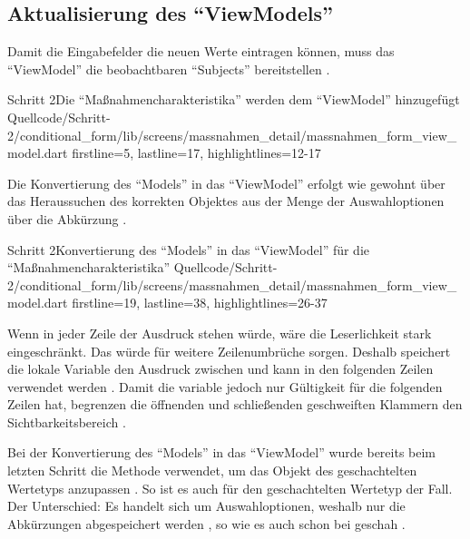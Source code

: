 \subsection{Aktualisierung des \enquote{ViewModels}}

Damit die Eingabefelder die neuen Werte eintragen können, muss das \enquote{ViewModel} die beobachtbaren \enquote{Subjects} bereitstellen . 

\begin{alexlisting}{Schritt 2}{Die \enquote{Maßnahmencharakteristika} werden dem \enquote{ViewModel} hinzugefügt}
  {Quellcode/Schritt-2/conditional_form/lib/screens/massnahmen_detail/massnahmen_form_view_model.dart}
  {firstline=5, lastline=17, highlightlines={12-17}}
  \label{lst:Schritt2MassnahmencharakteristikaWerdenDemViewModelHinzugefuegt}
\end{alexlisting}


Die Konvertierung des \enquote{Models} in das \enquote{ViewModel} erfolgt wie gewohnt über das Heraussuchen des korrekten Objektes aus der Menge der Auswahloptionen über die Abkürzung .

\begin{alexlisting}{Schritt 2}{Konvertierung des \enquote{Models} in das \enquote{ViewModel} für die \enquote{Maßnahmencharakteristika}}
  {Quellcode/Schritt-2/conditional_form/lib/screens/massnahmen_detail/massnahmen_form_view_model.dart}
  {firstline=19, lastline=38, highlightlines={26-37}}
  \label{lst:Schritt2KonvertierungDesModelsInDasViewModel}
\end{alexlisting}

Wenn in jeder Zeile der Ausdruck  stehen würde, wäre die Leserlichkeit stark eingeschränkt.
Das würde für weitere Zeilenumbrüche sorgen.
Deshalb speichert die lokale Variable  den Ausdruck zwischen und kann in den folgenden Zeilen verwendet werden .
Damit die variable  jedoch nur Gültigkeit für die folgenden Zeilen hat, begrenzen die öffnenden und schließenden geschweiften Klammern den Sichtbarkeitsbereich .

Bei der Konvertierung des \enquote{Models} in das \enquote{ViewModel} wurde bereits beim letzten Schritt die Methode  verwendet,
um das Objekt des geschachtelten Wertetyps  anzupassen .
So ist es auch für den geschachtelten Wertetyp  der Fall.
Der Unterschied: Es handelt sich um Auswahloptionen, weshalb nur die Abkürzungen abgespeichert werden , so wie es auch schon bei  geschah .

